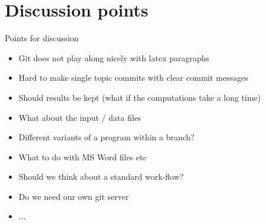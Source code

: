\documentclass[12pt]{beamer}
\begin{document}
\section{Discussion points}

\begin{frame}{Points for discussion}
	\begin{itemize}
		\item Git does not play along nicely with latex paragraphs
		\item Hard to make single topic commits with clear commit messages
		\item Should results be kept (what if the computations take a long time)
		\item What about the input / data files
		\item Different variants of a program within a branch?
		\item What to do with MS Word files etc
		\item Should we think about a standard work-flow?
		\item Do we need our own git server
		\item ... 
	\end{itemize}	
\end{frame}	
\end{document}
